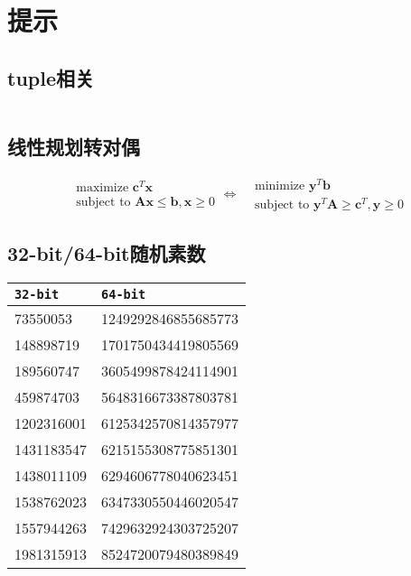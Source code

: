 \chapter{提示}

\section{tuple相关}
\inputminted{cpp}{\source/hints/tuple.cpp}

\section{线性规划转对偶}

\begin{equation*}
\begin{aligned}
&\text{maximize }\mathbf{c}^{T}\mathbf{x}\\
&\text{subject to }\mathbf{A}\mathbf{x} \leq \mathbf{b}, \mathbf{x} \geq 0
\end{aligned}
\Longleftrightarrow
\begin{aligned}
&\text{minimize }\mathbf{y}^{T}\mathbf{b}\\
&\text{subject to }\mathbf{y}^{T}\mathbf{A} \geq \mathbf{c}^{T}, \mathbf{y} \geq 0
\end{aligned}
\end{equation*}

\section{32-bit/64-bit随机素数}
\begin{tabular}{|l|l|}
\hline
\texttt{32-bit} & \texttt{64-bit} \\
\hline
73550053 & 1249292846855685773 \\
\hline
148898719 & 1701750434419805569 \\
\hline
189560747 & 3605499878424114901 \\
\hline
459874703 & 5648316673387803781 \\
\hline
1202316001 & 6125342570814357977 \\
\hline
1431183547 & 6215155308775851301 \\
\hline
1438011109 & 6294606778040623451 \\
\hline
1538762023 & 6347330550446020547 \\
\hline
1557944263 & 7429632924303725207 \\
\hline
1981315913 & 8524720079480389849 \\
\hline
\end{tabular}

